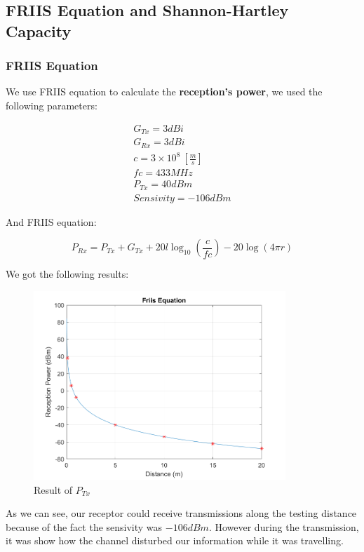 \subsection{FRIIS Equation and Shannon-Hartley Capacity}
\subsubsection{FRIIS Equation}
We use FRIIS equation to calculate the \textbf{reception's power}, we used the following parameters:

\begin{align*}
	G_{Tx}= 3 dBi\\
	G_{Rx}= 3 dBi\\
	c = 3 \times 10^8 \ \left[\frac{m}{s}\right] \\
	fc = 433 MHz\\
	P_{Tx} = 40 dBm\\
	Sensivity = -106 dBm
\end{align*}

And FRIIS equation:

\begin{equation}
	P_{Rx} = P_{Tx} + G_{Tx} + 20l\log_{10}\left(\frac{c}{fc}\right) -20\log(4\pi r)
\end{equation}

We got the following results:

\begin{figure}[!htbp]
	\centering
	\includegraphics[width=9.5cm]{images/friis.png}
	\caption{Result of $P_{Tx}$}
\end{figure}

As we can see, our receptor could receive transmissions along the testing distance because of the fact the sensivity was $-106 dBm$. However during the transmission, it was show how the channel disturbed our information while it was travelling.


